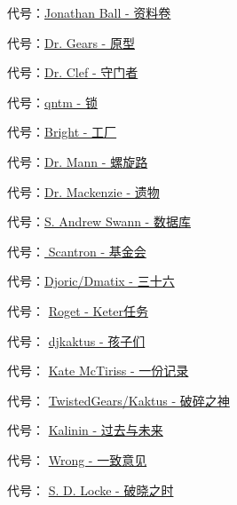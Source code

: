 
\hr

\begin{scpboxbrc}

代号：\hyperref[chap:SCP-001.sheaf.of.papers]{Jonathan Ball - 资料卷}

代号：\hyperref[chap:SCP-001.the.prototype]{Dr. Gears - 原型}

代号：\hyperref[chap:SCP-001.the.gate.guardian]{Dr. Clef - 守门者}

代号：\hyperref[chap:SCP-001.the.lock]{qntm - 锁}

代号：\hyperref[chap:SCP-001.the.factory]{Bright - 工厂}

代号：\hyperref[chap:SCP-001.the.spiral.path]{Dr. Mann - 螺旋路}

代号：\hyperref[chap:SCP-001.the.legacy]{Dr. Mackenzie - 遗物}

代号：\hyperref[chap:SCP-001.the.database]{S. Andrew Swann - 数据库}

代号：\hyperref[chap:SCP-001.the.foundation]{ Scantron - 基金会}

代号：\hyperref[chap:SCP-001.thirty.six]{Djoric/Dmatix - 三十六}

代号： \hyperref[chap:SCP-001.keter.duty]{Roget - Keter任务}

代号： \hyperref[chap:SCP-001.the.children]{djkaktus - 孩子们}

代号： \hyperref[chap:SCP-001.a.record]{Kate McTiriss - 一份记录}

代号： \hyperref[chap:SCP-001.the.broken.god]{TwistedGears/Kaktus - 破碎之神}

代号： \hyperref[chap:SCP-001.past.and.future]{Kalinin - 过去与未来}

代号： \hyperref[chap:SCP-001.the.consensus]{Wrong - 一致意见}

代号： \hyperref[chap:SCP-001.when.day.breaks]{S. D. Locke - 破晓之时}

\end{scpboxbrc}
